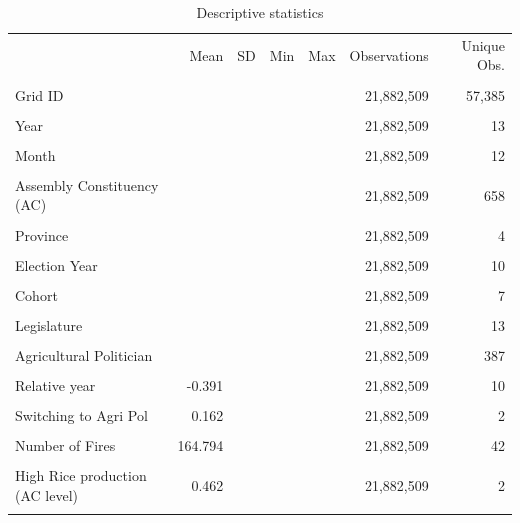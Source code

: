 \begin{table}[!h]
\centering
\caption{Descriptive statistics}
\label{app_desc_10_5km_protest}
\begin{tabular}{lrrrrrr}
\toprule
 & Mean & SD & Min & Max & Observations & Unique Obs.\\\\
\midrule
Grid ID &  &  &  &  & 21,882,509 & 57,385\\\\
Year &  &  &  &  & 21,882,509 & 13\\\\
Month &  &  &  &  & 21,882,509 & 12\\\\
Assembly Constituency (AC) &  &  &  &  & 21,882,509 & 658\\\\
Province &  &  &  &  & 21,882,509 & 4\\\\
Election Year &  &  &  &  & 21,882,509 & 10\\\\
Cohort &  &  &  &  & 21,882,509 & 7\\\\
Legislature &  &  &  &  & 21,882,509 & 13\\\\
Agricultural Politician &  &  &  &  & 21,882,509 & 387\\\\
Relative year & -0.391 &  &  &  & 21,882,509 & 10\\\\
Switching to Agri Pol & 0.162 &  &  &  & 21,882,509 & 2\\\\
Number of Fires & 164.794 &  &  &  & 21,882,509 & 42\\\\
High Rice production (AC level) & 0.462 &  &  &  & 21,882,509 & 2\\\\
\bottomrule
\end{tabular}
\end{table}
